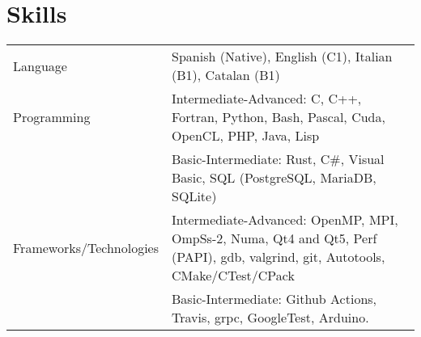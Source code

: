 \documentclass[a4paper,10pt]{article}
\begin{document}
\section{Skills}
\begin{tabularx}{\linewidth}{@{}l X@{}}
  Language & Spanish (Native), English (C1), Italian (B1), Catalan (B1)\\
  Programming & Intermediate-Advanced: C, C++, Fortran, Python, Bash, Pascal, Cuda, OpenCL,
                PHP, Java, Lisp \\
           & Basic-Intermediate: Rust, C\#, Visual Basic, SQL (PostgreSQL, MariaDB, SQLite) \\
  Frameworks/Technologies & Intermediate-Advanced: OpenMP, MPI, OmpSs-2, Numa, Qt4 and Qt5,
                            Perf (PAPI), gdb, valgrind, git, Autotools, CMake/CTest/CPack \\
           & Basic-Intermediate: Github Actions, Travis, grpc, GoogleTest, Arduino.
\end{tabularx}

\vfill
{}
\end{document}
